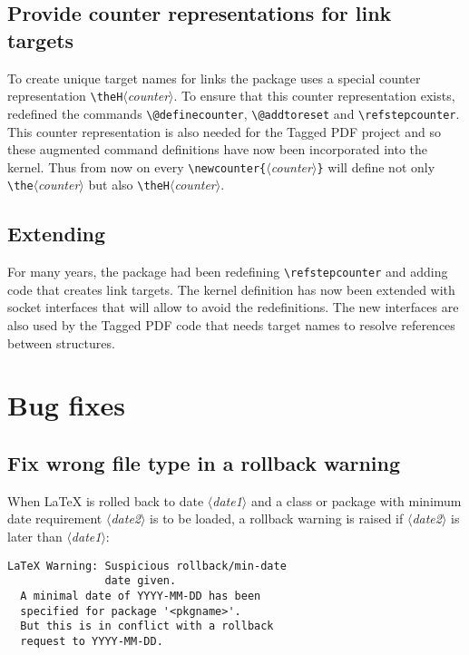 \documentclass{ltnews}
\providecommand\meta[1]{$\langle$\textrm{\itshape#1}$\rangle$}
\begin{document}
\subsection{Provide counter representations for link targets}

To create unique target names for links the package 
uses a special counter representation \verb+\theH+\meta{counter}. To
ensure that this counter representation exists, 
redefined the commands \verb+\@definecounter+, \verb+\@addtoreset+ and
\verb+\refstepcounter+. This counter representation is also needed for
the Tagged PDF project and so these augmented command definitions
have now been incorporated into the kernel.  Thus from now on every
\verb+\newcounter{+\meta{counter}\verb+}+ will define not only
\verb+\the+\meta{counter} but also \verb+\theH+\meta{counter}.

\subsection{Extending }

For many years, the package  had been redefining
\verb+\refstepcounter+ and adding code that creates link targets.  The
kernel definition has now been extended with socket interfaces that
will allow  to avoid the redefinitions. The new
interfaces are also used by the Tagged PDF code that needs target
names to resolve references between structures.


\section{Bug fixes}

\subsection{Fix wrong file type in a rollback warning}

When \LaTeX{} is rolled back to date \meta{date1} and a class or
package with minimum date requirement \meta{date2} is to be loaded, a
rollback warning is raised if \meta{date2} is later than \meta{date1}:
\begin{verbatim}
LaTeX Warning: Suspicious rollback/min-date
               date given.
  A minimal date of YYYY-MM-DD has been
  specified for package '<pkgname>'.
  But this is in conflict with a rollback
  request to YYYY-MM-DD.
\end{verbatim}
\end{document}
